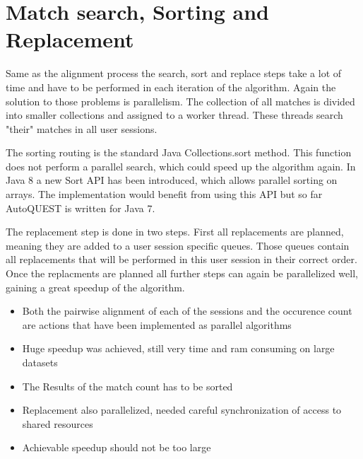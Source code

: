 \section{Match search, Sorting and Replacement}
Same as the alignment process the search, sort and replace steps take a lot of time and have to be performed in each iteration of the algorithm.
Again the solution to those problems is parallelism. The collection of all matches is divided into smaller collections and assigned to a worker thread. These threads
search "their" matches in all user sessions. 

The sorting routing is the standard Java Collections.sort method. This function does not perform a parallel search, which could speed up the algorithm again.
In Java 8 a new Sort API has been introduced, which allows parallel sorting on arrays. The implementation would  benefit from using this API but so far AutoQUEST is written for Java 7. 

The replacement step is done in two steps. First all replacements are planned, meaning they are added to a user session specific queues. 
Those queues contain all replacements that will be performed in this user session in their correct order. 
Once the replacments are planned all further steps can again be parallelized well, gaining a great speedup of the algorithm.





\begin{itemize}
	\item Both the pairwise alignment of each of the sessions and the occurence count are actions that have been implemented as parallel algorithms
	\item Huge speedup was achieved, still very time and ram consuming on large datasets
	\item The Results of the match count has to be sorted
	\item Replacement also parallelized, needed careful synchronization of access to shared resources
	\item Achievable speedup should not be too large
\end{itemize}


